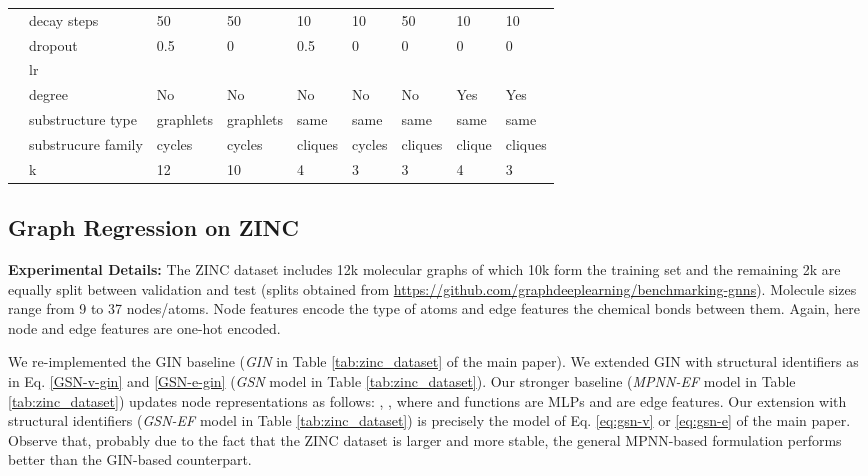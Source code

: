 \documentclass{article} \usepackage{iclr2021_conference,times}
\begin{document}
\begin{table}[t]
{\begin{tabular}{p{0.8cm}p{3cm}|llll|lll}
        & decay steps & 50 & 50 & 10 & 10 & 50 &  10 & 10 \\
         
         & dropout & 0.5 & 0 & 0.5 & 0 & 0 & 0 & 0\\
         
        & lr &  &  &  & & &  & \\
        
        & degree  & No & No & No & No & No & Yes & Yes\\

        
         
        & substructure type & graphlets & graphlets & same& same & same & same & same\\
        

        & substrucure family & cycles & cycles & cliques &cycles& cliques & clique & cliques\\
       

        
        & k  &12 & 10& 4 & 3 & 3 & 4 & 3\\
        
        
         
        

                

        
\end{tabular}}
\end{table}


\subsection{Graph Regression on ZINC}\label{zinc_appendix}

\noindent\textbf{Experimental Details: }The ZINC dataset includes 12k molecular graphs of which 10k form the training set and the remaining 2k are equally split between validation and test (splits obtained from \url{https://github.com/graphdeeplearning/benchmarking-gnns}). Molecule sizes range from 9 to 37 nodes/atoms. Node features encode the type of atoms and edge features the chemical bonds between them. Again, here node and edge features are one-hot encoded. 

We re-implemented the GIN baseline (\textit{GIN} in Table \ref{tab:zinc_dataset} of the main paper). We extended GIN with structural identifiers as in Eq. \ref{GSN-v-gin} and \ref{GSN-e-gin} (\textit{GSN} model in Table \ref{tab:zinc_dataset}). Our stronger baseline (\textit{MPNN-EF} model in Table \ref{tab:zinc_dataset}) updates node representations as follows:  ,     , where  and  functions are MLPs and  are edge features. Our extension with structural identifiers (\textit{GSN-EF} model in Table \ref{tab:zinc_dataset}) is precisely the model of Eq. \ref{eq:gsn-v} or \ref{eq:gsn-e} of the main paper. Observe that, probably due to the fact that the ZINC dataset is larger and more stable, the general MPNN-based formulation performs better than the GIN-based counterpart. 
\end{document}
